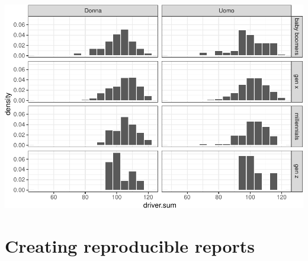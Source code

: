 \documentclass[
]{book}
\begin{document}
\includegraphics{R-for-social-research-and-business-analytics_files/figure-latex/unnamed-chunk-44-1.pdf}

\hypertarget{reproducible}{%
\chapter{Creating reproducible reports}\label{reproducible}}

  
\end{document}
